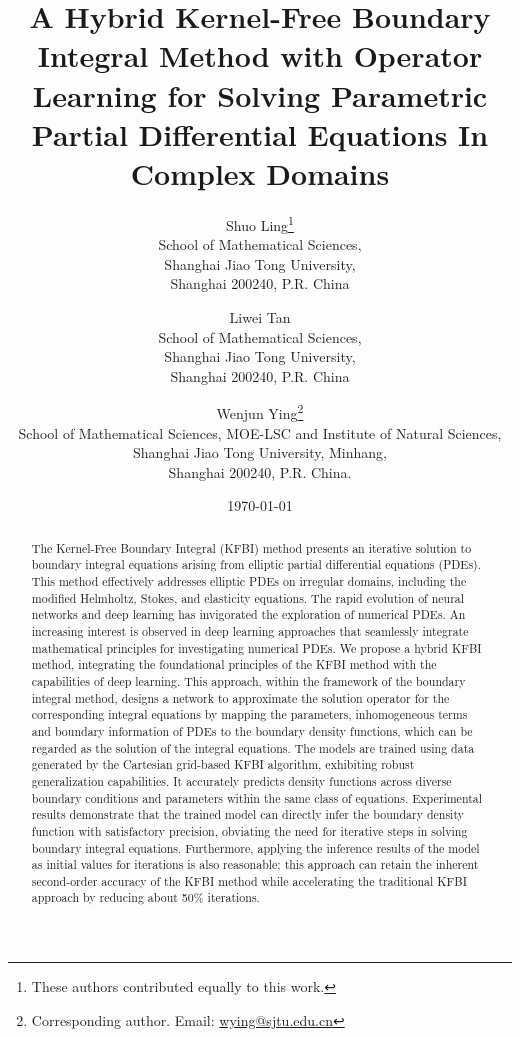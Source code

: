 \documentclass{article}
\title{A Hybrid Kernel-Free Boundary Integral Method with Operator Learning for Solving Parametric Partial Differential Equations In Complex Domains}
\author{Shuo Ling\thanks{These authors contributed equally to this work.} \\
    School of Mathematical Sciences, \\
    Shanghai Jiao Tong University, \\
    Shanghai 200240, P.R. China
    \and
    Liwei Tan\footnotemark[1] \\
    School of Mathematical Sciences, \\
    Shanghai Jiao Tong University, \\
    Shanghai 200240, P.R. China
    \and
    Wenjun Ying\thanks{Corresponding author. Email: \href{mailto:wying@sjtu.edu.cn}{wying@sjtu.edu.cn}} \\
    School of Mathematical Sciences, MOE-LSC and Institute of Natural Sciences, \\
    Shanghai Jiao Tong University, Minhang, \\
    Shanghai 200240, P.R. China.
}
\date{\today}
\begin{document}
\maketitle


\begin{abstract}
The Kernel-Free Boundary Integral (KFBI) method presents an iterative solution to boundary integral equations arising from elliptic partial differential equations (PDEs). This method effectively addresses elliptic PDEs on irregular domains, including the modified Helmholtz, Stokes, and elasticity equations. The rapid evolution of neural networks and deep learning has invigorated the exploration of numerical PDEs. An increasing interest is observed in deep learning approaches that seamlessly integrate mathematical principles for investigating numerical PDEs. We propose a hybrid KFBI method, integrating the foundational principles of the KFBI method with the capabilities of deep learning. This approach, within the framework of the boundary integral method, designs a network to approximate the solution operator for the corresponding integral equations by mapping the parameters, inhomogeneous terms and boundary information of PDEs to the boundary density functions, which can be regarded as the solution of the integral equations. The models are trained using data generated by the Cartesian grid-based KFBI algorithm, exhibiting robust generalization capabilities. It accurately predicts density functions across diverse boundary conditions and parameters within the same class of equations. Experimental results demonstrate that the trained model can directly infer the boundary density function with satisfactory precision, obviating the need for iterative steps in solving boundary integral equations. Furthermore, applying the inference results of the model as initial values for iterations is also reasonable; this approach can retain the inherent second-order accuracy of the KFBI method while accelerating the traditional KFBI approach by reducing about 50\% iterations.
\end{abstract}
\end{document}
